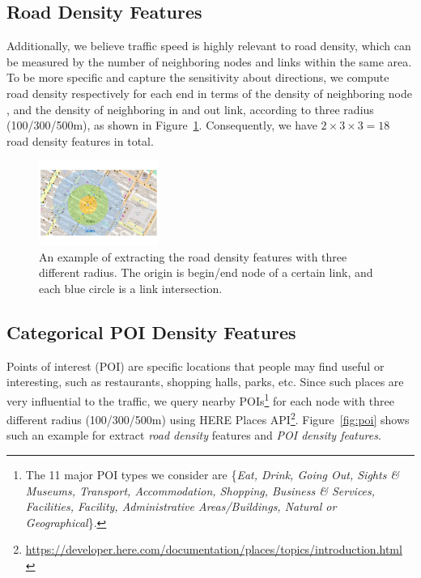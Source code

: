 \documentclass[letterpaper]{article} %
\begin{document}
\subsection{Road Density Features}
Additionally, we believe traffic speed is highly relevant to road density, which can be measured by the number of neighboring nodes and links within the same area.
To be more specific and capture the sensitivity about directions, we compute road density respectively for each end in terms of the density of neighboring node , and the density of neighboring in and out link,  according to three radius (100/300/500m), as shown in Figure~\ref{fig:road_density}.
Consequently, we have $2 \times 3 \times 3 = 18$ road density features in total.
%
\begin{figure}[t]
	\centering
	\includegraphics[width=0.35\textwidth]{figures/roaddensity.pdf}
	\caption{An example of extracting the road density features with three different radius. The origin is begin/end node of a certain link, and each blue circle is a link intersection.}
	\label{fig:road_density}
\end{figure}


\subsection{Categorical POI Density Features}
Points of interest (POI) are specific locations that people may find useful or interesting, such as restaurants, shopping halls, parks, etc.
Since such places are very influential to the traffic, we query nearby POIs\footnote{The 11 major POI types we consider are \{\textit{Eat, Drink, Going Out, Sights \& Museums, Transport, Accommodation, Shopping, Business \& Services, Facilities, Facility, Administrative Areas/Buildings, Natural or Geographical}\}. } 
for each node with three different radius (100/300/500m) using HERE Places API\footnote{\url{https://developer.here.com/documentation/places/topics/introduction.html
}}. 
Figure~\ref{fig:poi} shows such an example for extract \textit{road density} features and\textit{ POI density features}. 
\end{document}

